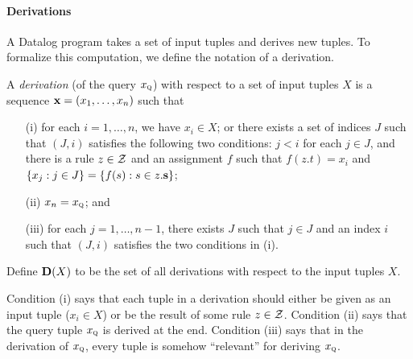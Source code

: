 \paragraph{Derivations}

A Datalog program takes a set of input tuples and derives new
tuples.  To formalize this computation, we define the notation of a derivation.

A {\em derivation} (of the query $x_\text{\sc q}$) with respect to a set of input tuples
$X$ is a sequence $\mathbf{x} = (x_1, \dots, x_n)$ such that
\begin{enumerate}
\item [(i)] for each $i = 1, \dots, n$, we have $x_i \in X$; or
there exists a set of indices $J$ such that $(J,i)$ satisfies the following two conditions:
$j < i$ for each $j \in J$, and
there is a rule $z \in \mathcal{Z}$ and an assignment $f$
such that $f(z.t) = x_i$ and
$\{ x_j : j \in J \} = \{ f(s) : s \in z.\mathbf{s} \}$;
\item [(ii)] $x_n = x_\text{\sc q}$; and
\item [(iii)] 
for each $j = 1, \dots, n\!-\!1$,
there exists $J$ such that $j \in J$ and an index $i$
such that $(J,i)$ satisfies the two conditions in (i).
\end{enumerate}
Define $\mathbf{D}(X)$ to be the set of all derivations with respect to the input tuples $X$.

Condition (i) says that each tuple in a derivation
should either be given as an input tuple ($x_i \in X$)
or be the result of some rule $z \in \mathcal{Z}$.
Condition (ii) says that the query tuple $x_\text{\sc q}$ is derived at the end.
Condition (iii) says that in the derivation of $x_\text{\sc q}$, every tuple is somehow ``relevant'' for deriving $x_\text{\sc q}$.

